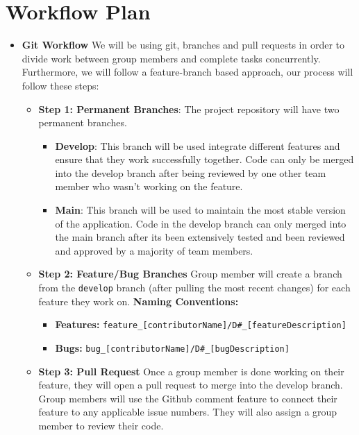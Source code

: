 \documentclass{article}
\begin{document}
\section{Workflow Plan}

\begin{itemize}
	\item\textbf{Git Workflow \newline}
	 We will be using git, branches and pull requests in order to divide work between group members and complete tasks concurrently. 
   Furthermore, we will follow a feature-branch based approach, our process will follow these steps:
   \begin{itemize}
    \item \textbf{Step 1: Permanent Branches}: The project repository will have two permanent branches. 
   \begin{itemize}
      \item \textbf{Develop}: This branch will be used integrate different features and ensure that they work successfully together. Code can only be merged into the develop branch after being reviewed by one other team member who wasn't working on the feature. 
      \item \textbf{Main}: This branch will be used to maintain the most stable version of the application. Code in the develop branch can only merged into the main branch after its been extensively tested and been reviewed and approved by a majority of team members. 
    \end{itemize}

    \item \textbf{Step 2: Feature/Bug Branches} Group member will create a branch from the \texttt{develop} branch (after pulling the most recent changes) for each feature they work on. \newline
    \textbf{Naming Conventions:}
    \begin{itemize}
      \item \textbf{Features: }\texttt{feature\_[contributorName]/D\#\_[featureDescription]} 
      \item \textbf{Bugs: }  \texttt{bug\_[contributorName]/D\#\_[bugDescription]}
    \end{itemize}

  \item \textbf{Step 3: Pull Request} Once a group member is done working on their feature, they will open a pull request to merge into the develop branch. Group members will use the Github comment feature to connect their feature to any applicable issue numbers. They will also assign a group member to review their code.
    \end{itemize}


\end{itemize}
\end{document}
